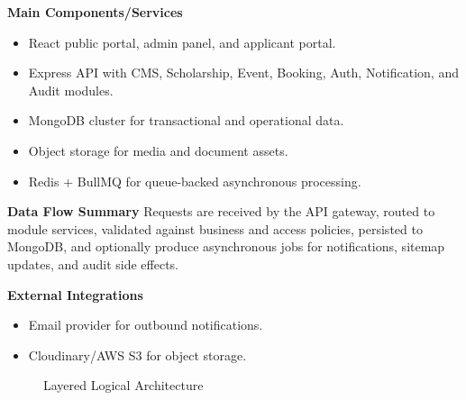 \documentclass[12pt,a4paper]{article}
\begin{document}
\textbf{Main Components/Services}
\begin{itemize}[nosep]
\item React public portal, admin panel, and applicant portal.
\item Express API with CMS, Scholarship, Event, Booking, Auth, Notification, and Audit modules.
\item MongoDB cluster for transactional and operational data.
\item Object storage for media and document assets.
\item Redis + BullMQ for queue-backed asynchronous processing.
\end{itemize}

\textbf{Data Flow Summary}
Requests are received by the API gateway, routed to module services, validated against business and access policies, persisted to MongoDB, and optionally produce asynchronous jobs for notifications, sitemap updates, and audit side effects.

\textbf{External Integrations}
\begin{itemize}[nosep]
\item Email provider for outbound notifications.
\item Cloudinary/AWS S3 for object storage.
\end{itemize}

\begin{figure}[H]
\centering
{}
\caption{Layered Logical Architecture}
\label{fig:logical-architecture}
\end{figure}
\end{document}
